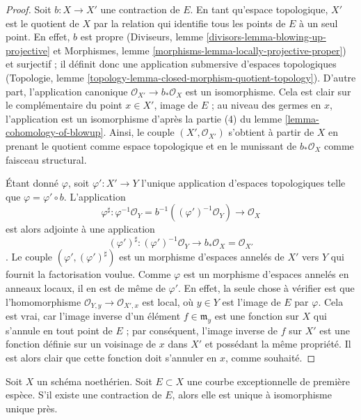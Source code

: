 \begin{proof} Soit $b : X \to X'$ une contraction de $E$. En tant qu'espace topologique, $X'$ est le quotient de $X$ par la relation qui identifie tous les points de $E$ à un seul point. En effet, $b$ est propre (Diviseurs, lemme \ref{divisors-lemma-blowing-up-projective} et Morphismes, lemme \ref{morphisms-lemma-locally-projective-proper}) et surjectif ; il définit donc une application submersive d'espaces topologiques (Topologie, lemme \ref{topology-lemma-closed-morphism-quotient-topology}). D'autre part, l'application canonique $\mathcal{O}_{X'} \to b_*\mathcal{O}_X$ est un isomorphisme. Cela est clair sur le complémentaire du point $x \in X'$, image de $E$ ; au niveau des germes en $x$, l'application est un isomorphisme d'après la partie (4) du lemme \ref{lemma-cohomology-of-blowup}. Ainsi, le couple $(X', \mathcal{O}_{X'})$ s'obtient à partir de $X$ en prenant le quotient comme espace topologique et en le munissant de $b_*\mathcal{O}_X$ comme faisceau structural.

\medskip\noindent Étant donné $\varphi$, soit $\varphi' : X' \to Y$ l'unique application d'espaces topologiques telle que $\varphi = \varphi' \circ b$. L'application $$
\varphi^\sharp : \varphi^{-1}\mathcal{O}_Y =
b^{-1}((\varphi')^{-1}\mathcal{O}_Y) \to \mathcal{O}_X
$$ est alors adjointe à une application $$
(\varphi')^\sharp :
(\varphi')^{-1}\mathcal{O}_Y \to b_*\mathcal{O}_X = \mathcal{O}_{X'}
$$. Le couple $(\varphi', (\varphi')^\sharp)$ est un morphisme d'espaces annelés de $X'$ vers $Y$ qui fournit la factorisation voulue. Comme $\varphi$ est un morphisme d'espaces annelés en anneaux locaux, il en est de même de $\varphi'$. En effet, la seule chose à vérifier est que l'homomorphisme $\mathcal{O}_{Y, y} \to \mathcal{O}_{X', x}$ est local, où $y \in Y$ est l'image de $E$ par $\varphi$. Cela est vrai, car l'image inverse d'un élément $f \in \mathfrak m_y$ est une fonction sur $X$ qui s'annule en tout point de $E$ ; par conséquent, l'image inverse de $f$ sur $X'$ est une fonction définie sur un voisinage de $x$ dans $X'$ et possédant la même propriété. Il est alors clair que cette fonction doit s'annuler en $x$, comme souhaité. \end{proof}

\begin{lemma} \label{lemma-contraction-unique} Soit $X$ un schéma noethérien. Soit $E \subset X$ une courbe exceptionnelle de première espèce. S'il existe une contraction de $E$, alors elle est unique à isomorphisme unique près. \end{lemma}

